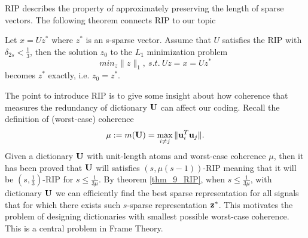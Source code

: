 \documentclass[../book-template.tex]{subfiles}
\begin{document}
RIP describes the property of approximately preserving the length of sparse vectors. The following theorem connects RIP to our topic
\begin{theorem}\label{thm_9_RIP}
	Let $x=Uz^*$ where $z^*$ is an s-sparse vector. Assume that $U$ satisfies the RIP with $\delta_{2s}<\frac{1}{3}$, then the solution $z_0$ to the $L_1$ minimization problem
	\begin{equation*}
		min_z \|z\|_1,\ s.t.\ Uz=x=Uz^*
	\end{equation*}
	becomes $z^*$ exactly, i.e. $z_0=z^*$.
\end{theorem}
The point to introduce RIP is to give some insight about how coherence that measures the redundancy of dictionary ${\bf U}$ can affect our coding. Recall the definition of (worst-case) coherence
\begin{equation*}
	\mu:=m({\bf U})=\max_{i\neq j}\|{\bf u}_i^T{\bf u}_j\|.
\end{equation*}
Given a dictionary ${\bf U}$ with unit-length atoms and worst-case coherence $\mu$, then it has been proved that ${\bf U}$ will satisfies $(s,\mu(s-1))$-RIP meaning that it will be $(s,\frac{1}{3})$-RIP for $s\leq \frac{1}{3\mu}$. By theorem \ref{thm_9_RIP}, when $s\leq \frac{1}{3\mu}$, with dictionary ${\bf U}$ we can efficiently find the best sparse representation for all signals that for which there exists such $s$-sparse representation ${\bf z}^*$. This motivates the problem of designing dictionaries with smallest possible worst-case coherence. This is a central problem in Frame Theory.
\end{document}
